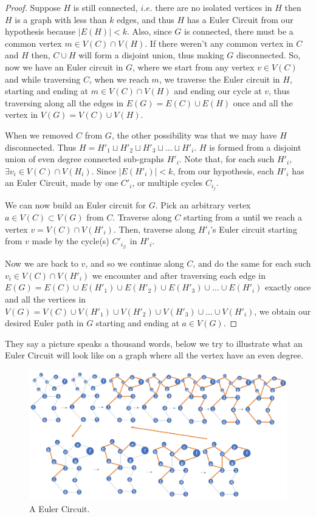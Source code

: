 \documentclass[12pt, fullpage]{article}
\begin{document}
\begin{proof}
 	  Suppose $H$ is still connected, $i.e.$ there are no isolated vertices in $H$ then $H$ is a graph with less than $k$ edges, and thus $H$ has a Euler Circuit from our hypothesis because $\vert E(H) \vert < k$. Also, since $G$ is connected, there must be a common vertex $m \in V(C) \cap V(H)$. If there weren't any common vertex in $C$ and $H$ then, $C \cup H$ will form a disjoint union, thus making $G$ disconnected. So, now we have an Euler circuit in $G$, where we start from any vertex $v \in V(C)$ and while traversing $C$, when we reach $m$, we traverse the Euler circuit in $H$, starting and ending at $m \in V(C) \cap V(H)$ and ending our cycle at $v$, thus traversing along all the edges in $E(G) = E(C) \cup E(H)$ once and all the vertex in $V(G) = V(C) \cup V(H)$.
 	 
 	   When we removed $C$ from $G$, the other possibility was that we may have $H$ disconnected. Thus $H = H'_1 \sqcup H'_2 \sqcup H'_3 \sqcup ... \sqcup H'_i$. $H$ is formed from a disjoint union of even degree connected sub-graphs $H'_i$. Note that, for each such $H'_i$, $\exists v_i \in V(C) \cap V(H_i)$. Since $\vert E(H'_i) \vert < k$, from our hypothesis, each $H'_i$ has an Euler Circuit, made by one $C'_i$, or multiple cycles $C_{i_j}$.
 	   
 	   We can now build an Euler circuit for $G$. Pick an arbitrary vertex $a \in V(C) \subset V(G)$ from $C$. Traverse along $C$ starting from $a$ until we reach a vertex $v = V(C) \cap V(H'_i)$. Then, traverse along $H'_i$'s Euler circuit starting from $v$ made by the cycle(s) $C'_{i_{j)}}$ in $H'_i$. 
 	   
 	   Now we are back to $v$, and so we continue along $C$, and do the same for each such $v_i \in V(C) \cap V(H'_i)$ we encounter and after traversing each edge in $E(G) = E(C) \cup E(H'_1)\cup E(H'_2) \cup E(H'_3)\cup... \cup E(H'_i)$ exactly once and all the vertices in $V(G) = V(C) \cup V(H'_1)\cup V(H'_2) \cup V(H'_3) \cup... \cup V(H'_i)$, we obtain our desired Euler path in $G$ starting and ending at $a \in V(G)$. 	  
\end{proof} 
 	  They say a picture speaks a thousand words, below we try to illustrate what an Euler Circuit will look like on a graph where all the vertex have an even degree.
\begin{figure}[h!]
  \includegraphics[width=\linewidth]{circuit.jpg}
  \caption{A Euler Circuit.}
\end{figure}
\end{document}
